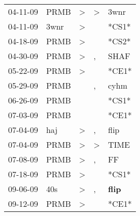 \begin{supertabular}{p{0.07\textwidth}p{0.06\textwidth}p{0.02\textwidth}p{0.02\textwidth}p{0.06\textwidth}}
          04-11-09\textsuperscript{} &           PRMB\textsuperscript{} &     \textgreater &     \textgreater &           3wnr\textsuperscript{} \\
          04-11-09\textsuperscript{} &           3wnr\textsuperscript{} &     \textgreater &                  &                            *CS1* \\
          04-18-09\textsuperscript{} &           PRMB\textsuperscript{} &     \textgreater &                  &                            *CS2* \\
          04-30-09\textsuperscript{} &           PRMB\textsuperscript{} &     \textgreater &                , &           SHAF\textsuperscript{} \\
          05-22-09\textsuperscript{} &           PRMB\textsuperscript{} &     \textgreater &                  &                            *CE1* \\
          05-29-09\textsuperscript{} &           PRMB\textsuperscript{} &                  &                , &           cyhm\textsuperscript{} \\
          06-26-09\textsuperscript{} &           PRMB\textsuperscript{} &                  &                  &                            *CS1* \\
          07-03-09\textsuperscript{} &           PRMB\textsuperscript{} &                  &                  &                            *CE1* \\
          07-04-09\textsuperscript{} &            haj\textsuperscript{} &     \textgreater &                , &           flip\textsuperscript{} \\
          07-04-09\textsuperscript{} &           PRMB\textsuperscript{} &     \textgreater &     \textgreater &           TIME\textsuperscript{} \\
          07-08-09\textsuperscript{} &           PRMB\textsuperscript{} &     \textgreater &                , &             FF\textsuperscript{} \\
          07-18-09\textsuperscript{} &           PRMB\textsuperscript{} &     \textgreater &                  &                            *CS1* \\
          09-06-09\textsuperscript{} &            40s\textsuperscript{} &     \textgreater &                , &  \textbf{flip\textsuperscript{}} \\
          09-12-09\textsuperscript{} &           PRMB\textsuperscript{} &     \textgreater &                  &                            *CE1* \\

\end{supertabular}

